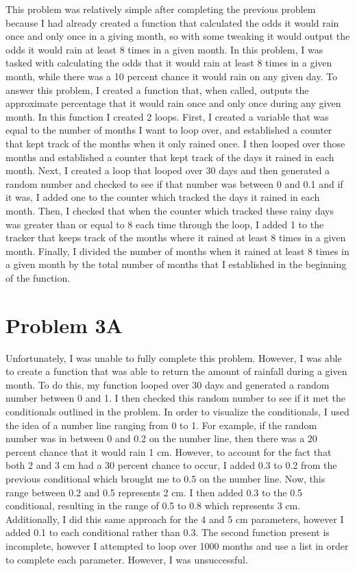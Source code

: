 \documentclass[onecolumn]{revtex4}
\begin{document}
	This problem was relatively simple after completing the previous problem because I had already created a function that calculated the odds it would rain once and only once in a giving month, so with some tweaking it would output the odds it would rain at least 8 times in a given month. In this problem, I was tasked with calculating the odds that it would rain at least 8 times in a given month, while there was a 10 percent chance it would rain on any given day. To answer this problem, I created a function that, when called, outputs the approximate percentage that it would rain once and only once during any given month. In this function I created 2 loops. First, I created a variable that was equal to the number of months I want to loop over, and established a counter that kept track of the months when it only rained once. I then looped over those months and established a counter that kept track of the days it rained in each month. Next, I created a loop that looped over 30 days and then generated a random number and checked to see if that number was between 0 and 0.1 and if it was, I added one to the counter which tracked the days it rained in each month. Then, I checked that when the counter which tracked these rainy days was greater than or equal to 8 each time through the loop, I added 1 to the tracker that keeps track of the months where it rained at least 8 times in a given month. Finally, I divided the number of months when it rained at least 8 times in a given month by the total number of months that I established in the beginning of the function.


\section{Problem 3A}

	Unfortunately, I was unable to fully complete this problem. However, I was able to create a function that was able to return the amount of rainfall during a given month. To do this, my function looped over 30 days and generated a random number between 0 and 1. I then checked this random number to see if it met the conditionals outlined in the problem. In order to visualize the conditionals, I used the idea of  a number line ranging from 0 to 1. For example, if  the random number was in between 0 and 0.2 on the number line, then there was a 20 percent chance that it would rain 1 cm. However, to account for the fact that both 2 and 3 cm had a 30 percent chance to occur, I added 0.3 to 0.2 from the previous conditional which brought me to 0.5 on the number line. Now, this range between 0.2 and 0.5 represents 2 cm. I then added 0.3 to the 0.5 conditional, resulting in the range of 0.5 to 0.8 which represents 3 cm. Additionally, I did this same approach for the 4 and 5 cm parameters, however I added 0.1 to each conditional rather than 0.3. The second function present is incomplete, however I attempted to loop over 1000 months and use a list in order to complete each parameter. However, I was unsuccessful.
\end{document}
